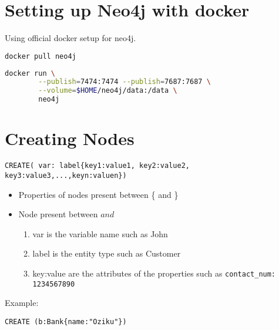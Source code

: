 \documentclass[../main.tex]{subfiles}
\begin{document}
% 
% 
% 

\section{Setting up Neo4j with docker}
Using official docker setup \href{https://hub.docker.com/_/neo4j}{\color{blue}{link}} for neo4j.
\begin{lstlisting}[language=bash, caption={get neo4j image}]
docker pull neo4j
\end{lstlisting}
\begin{lstlisting}[language=bash, caption={Starting neo4j container}]
docker run \
		--publish=7474:7474 --publish=7687:7687 \
		--volume=$HOME/neo4j/data:/data \
		neo4j
\end{lstlisting}

\section{Creating Nodes}
\begin{lstlisting}[language=cypher, caption={Create Node}]
CREATE( var: label{key1:value1, key2:value2, key3:value3,...,keyn:valuen})
\end{lstlisting}
\begin{itemize}
	\item{Properties of nodes present between \{ and \}}
	\item{ 
			Node present between \( and \)
			\begin{enumerate}
				\item{var is the variable name such as John}
				\item{label is the entity type such as Customer}
				\item{key:value are the attributes of the properties such as  \lstinline{contact_num: 1234567890}}
			\end{enumerate}
		}
\end{itemize}
Example: 
\begin{lstlisting}[language=cypher, caption={Create Node Example}]
CREATE (b:Bank{name:"Oziku"})
\end{lstlisting}
\end{document}
